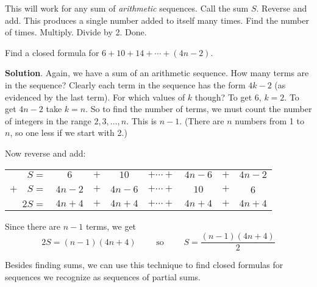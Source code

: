 \documentclass[11pt,]{book}
\theoremstyle{ptxplainnotitle}
\theoremstyle{ptxplaintitle}
\theoremstyle{ptxdefinitionnotitle}
\theoremstyle{ptxdefinitiontitle}
\theoremstyle{ptxdefinitionnotitle}
\theoremstyle{ptxdefinitiontitle}
\theoremstyle{ptxdefinitionnotitle}
\theoremstyle{ptxdefinitiontitle}
\theoremstyle{ptxdefinitiontitlenonumber}
\theoremstyle{ptxdefinitiontitlenonumber}
\numberwithin{equation}{chapter}
\newcommand{\hrulethin}  {\noalign{\hrule height 0.04em}}
\begin{document}
\hypertarget{p-188}{}%
This will work for any sum of \emph{arithmetic} sequences. Call the sum \(S\). Reverse and add. This produces a single number added to itself many times. Find the number of times. Multiply. Divide by 2. Done.%
\begin{example}\label{example-8}
\hypertarget{p-189}{}%
Find a closed formula for \(6 + 10 + 14 + \cdots + (4n - 2)\).%
\par\smallskip%
\noindent\textbf{Solution}.\hypertarget{solution-14}{}\quad%
\hypertarget{p-190}{}%
Again, we have a sum of an arithmetic sequence. How many terms are in the sequence?  Clearly each term in the sequence has the form \(4k -2\) (as evidenced by the last term). For which values of \(k\) though? To get 6, \(k = 2\). To get \(4n-2\) take \(k = n\). So to find the number of terms, we must count the number of integers in the range \(2,3,\ldots, n\). This is \(n-1\). (There are \(n\) numbers from 1 to \(n\), so one less if we start with 2.)%
\par
\hypertarget{p-191}{}%
Now reverse and add:%
\begin{sidebyside}{1}{0}{0}{0}
\begin{sbspanel}{1}
{\centering%
\begin{tabular}{rccccccc}
\(S  =\)&\(6\)&\(+\)&\(10\)&\(+ \cdots +\)&\(4n-6\)&\(+\)&\(4n-2\)\tabularnewline[0pt]
\(+ \quad S  =\)&\(4n-2\)&\(+\)&\(4n-6\)&\(+ \cdots +\)&\(10\)&\(+\)&6\tabularnewline\hrulethin
\(2S  =\)&\(4n+4\)&\(+\)&\(4n+4\)&\(+ \cdots +\)&\(4n+4\)&\(+\)&\(4n+4\)
\end{tabular}
\par}
\end{sbspanel}
\end{sidebyside}
\par
\hypertarget{p-192}{}%
Since there are \(n-1\) terms, we get%
\begin{equation*}
2S = (n-1)(4n+4)\qquad \mbox{ so } \qquad S = \frac{(n-1)(4n+4)}{2}
\end{equation*}
%
\end{example}
\hypertarget{p-193}{}%
Besides finding sums, we can use this technique to find closed formulas for sequences we recognize as sequences of partial sums.%
\end{document}
